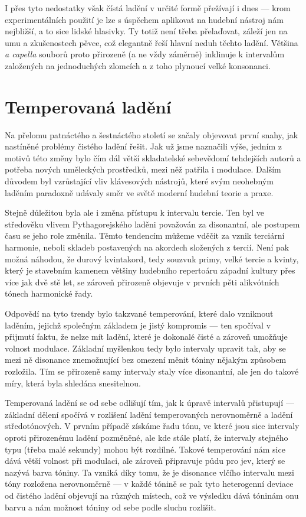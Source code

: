 \documentclass[12pt]{article}
\begin{document}
I přes tyto nedostatky však čístá ladění v určité formě přežívají i dnes — krom experimentálních použití je lze s úspěchem aplikovat na hudební nástroj nám nejbližší, a to sice lidské hlasivky. Ty totiž není třeba přelaďovat, záleží jen na umu a zkušenostech pěvce, což elegantně řeší hlavní neduh těchto ladění. Většina \emph{a capella} souborů proto přirozeně (a ne vždy záměrně) inklinuje k intervalům založených na jednoduchých zlomcích a z toho plynoucí velké konsonanci.
\pagebreak

\section{Temperovaná ladění}

Na přelomu patnáctého a šestnáctého století se začaly objevovat první snahy, jak nastíněné problémy čistého ladění řešit. Jak už jsme naznačili výše, jedním z motivů této změny bylo čím dál větší skladatelské sebevědomí tehdejších autorů a potřeba nových uměleckých prostředků, mezi něž patřila i modulace. Dalším důvodem byl vzrůstající vliv klávesových nástrojů, které svým neohebným laděním paradoxně udávaly směr ve světě moderní hudební teorie a praxe.

Stejně důležitou byla ale i změna přístupu k intervalu tercie. Ten byl ve středověku vlivem Pythagorejského laděni považován za disonantní, ale postupem času se jeho role změnila. Těmto tendencím můžeme vděčit za vznik terciární harmonie, neboli skladeb postavených na akordech složených z tercií. Není pak možná náhodou, že durový kvintakord, tedy souzvuk primy, velké tercie a kvinty, který je stavebním kamenem většiny hudebního repertoáru západní kultury přes více jak dvě stě let, se zároveň přirozeně objevuje v prvních pěti alikvótních tónech harmonické řady.

Odpovědí na tyto trendy bylo takzvané temperování, které dalo vzniknout laděním, jejichž společným základem je jistý kompromis — ten spočíval v přijmutí faktu, že nelze mít ladění, které je dokonalé čisté a zároveň umožňuje volnost modulace. Základní myšlenkou tedy bylo intervaly upravit tak, aby se mezi ně disonance znemožnující bez omezení měnit tóniny nějakým způsobem rozložila. Tím se přirozeně samy intervaly staly více disonantní, ale jen do takové míry, která byla shledána snesitelnou.

Temperovaná ladění se od sebe odlišují tím, jak k úpravě intervalů přistupují — základní dělení spočívá v rozlišení ladění temperovaných nerovnoměrně a ladění středotónových. V prvním případě získáme řadu tónu, ve které jsou sice intervaly oproti přirozenému ladění pozměněné, ale kde stále platí, že intervaly stejného typu (třeba malé sekundy) mohou být rozdílné. Takové temperování nám sice dává větší volnost při modulaci, ale zároveň připravuje půdu pro jev, který se nazývá barva tóniny. Ta vzniká díky tomu, že je disonance vlčího intervalu mezi tóny rozložena nerovnoměrně — v každé tónině se pak tyto heterogenní deviace od čistého ladění objevují na různých místech, což ve výsledku dává tóninám onu barvu a nám možnost tóniny od sebe podle sluchu rozlišit.
\end{document}
